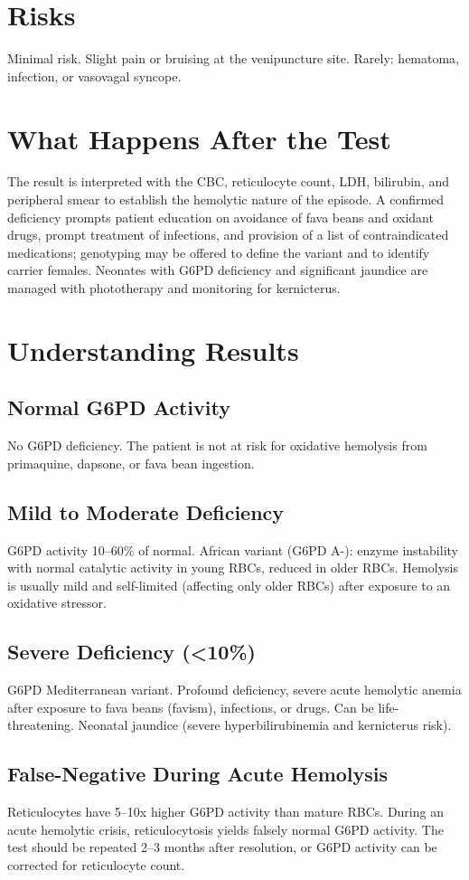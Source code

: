 \section*{Risks}
Minimal risk. Slight pain or bruising at the venipuncture site. Rarely: hematoma, infection, or vasovagal syncope.
\section*{What Happens After the Test}
The result is interpreted with the CBC, reticulocyte count, LDH, bilirubin, and peripheral smear to establish the hemolytic nature of the episode. A confirmed deficiency prompts patient education on avoidance of fava beans and oxidant drugs, prompt treatment of infections, and provision of a list of contraindicated medications; genotyping may be offered to define the variant and to identify carrier females. Neonates with G6PD deficiency and significant jaundice are managed with phototherapy and monitoring for kernicterus.
\section*{Understanding Results}
\subsection*{Normal G6PD Activity}
No G6PD deficiency. The patient is not at risk for oxidative hemolysis from primaquine, dapsone, or fava bean ingestion.
\subsection*{Mild to Moderate Deficiency}
G6PD activity 10--60\% of normal. African variant (G6PD A-): enzyme instability with normal catalytic activity in young RBCs, reduced in older RBCs. Hemolysis is usually mild and self-limited (affecting only older RBCs) after exposure to an oxidative stressor.
\subsection*{Severe Deficiency (<10\%)}
G6PD Mediterranean variant. Profound deficiency, severe acute hemolytic anemia after exposure to fava beans (favism), infections, or drugs. Can be life-threatening. Neonatal jaundice (severe hyperbilirubinemia and kernicterus risk).
\subsection*{False-Negative During Acute Hemolysis}
Reticulocytes have 5--10x higher G6PD activity than mature RBCs. During an acute hemolytic crisis, reticulocytosis yields falsely normal G6PD activity. The test should be repeated 2--3 months after resolution, or G6PD activity can be corrected for reticulocyte count.
